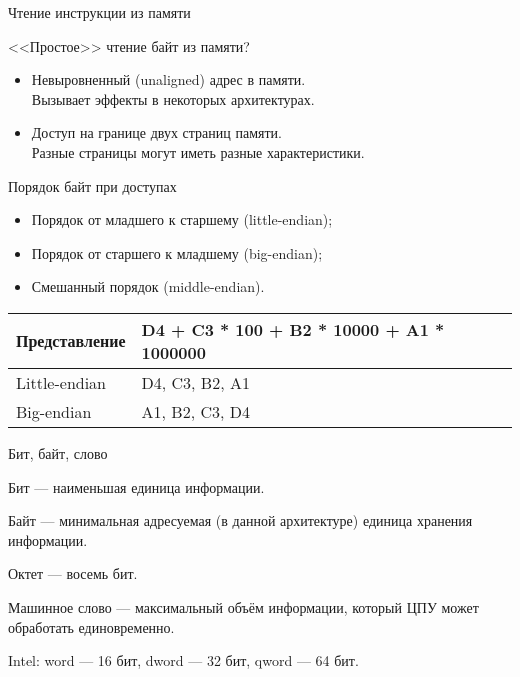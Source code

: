 \begin{frame}{Чтение инструкции из памяти}

<<Простое>> чтение байт из памяти?

\pause

\begin{itemize}
    \item Невыровненный (\abbr unaligned) адрес в памяти. \\
    Вызывает эффекты в некоторых архитектурах.
    \pause\bigskip
    \item Доступ на границе двух страниц памяти. \\
    Разные страницы могут иметь разные характеристики.
\end{itemize}

\end{frame}

\begin{frame}{Порядок байт при доступах}

\begin{itemize}
    \item Порядок от младшего к старшему (\abbr little-endian);
    \item Порядок от старшего к младшему (\abbr big-endian);
    \item Смешанный порядок (\abbr middle-endian).
\end{itemize}

\pause

\begin{table}[htpb]
    \centering
    \begin{tabular}{|l|l|}
    \hline
    Представление   &   D4 + C3 * 100 + B2 * 10000 + A1 * 1000000   \\
    \hline
    Little-endian   &   D4, C3, B2, A1                              \\
    \hline
    Big-endian      &   A1, B2, C3, D4                              \\
    \hline
    \end{tabular}
\end{table}

\end{frame}

\begin{frame}{Бит, байт, слово}

Бит \pause --- наименьшая единица информации.

\pause\bigskip

Байт \pause --- минимальная адресуемая (в данной архитектуре) единица хранения
информации.

\pause\bigskip

Октет --- восемь бит.

\pause\bigskip

Машинное слово \pause --- максимальный объём информации, который ЦПУ может
обработать единовременно.

\pause\bigskip

Intel: word — 16 бит, dword — 32 бит, qword — 64 бит.

\end{frame}

